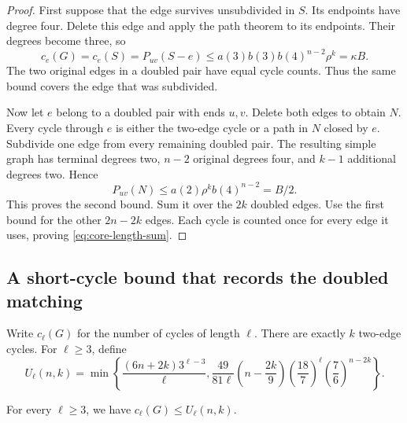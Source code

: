 \begin{proof}
First suppose that the edge survives unsubdivided in $S$.
Its endpoints have degree four.
Delete this edge and apply the path theorem to its endpoints.
Their degrees become three, so
\[
 c_e(G)=c_e(S)=P_{uv}(S-e)
 \le a(3)b(3)b(4)^{n-2}\rho^k=\kappa B.
\]
The two original edges in a doubled pair have equal cycle counts.
Thus the same bound covers the edge that was subdivided.

Now let $e$ belong to a doubled pair with ends $u,v$.
Delete both edges to obtain $N$.
Every cycle through $e$ is either the two-edge cycle or a path in $N$ closed by $e$.
Subdivide one edge from every remaining doubled pair.
The resulting simple graph has terminal degrees two, $n-2$ original degrees four, and $k-1$ additional degrees two.
Hence
\[
 P_{uv}(N)\le a(2)\rho^k b(4)^{n-2}=B/2.
\]
This proves the second bound.
Sum it over the $2k$ doubled edges.
Use the first bound for the other $2n-2k$ edges.
Each cycle is counted once for every edge it uses, proving \eqref{eq:core-length-sum}.
\end{proof}

\subsection{A short-cycle bound that records the doubled matching}

Write $c_\ell(G)$ for the number of cycles of length $\ell$.
There are exactly $k$ two-edge cycles.
For $\ell\ge3$, define
\begin{equation}\label{eq:core-U}
 U_\ell(n,k)=\min\left\{
  \frac{(6n+2k)3^{\ell-3}}\ell,
  \frac{49}{81\ell}\left(n-\frac{2k}{9}\right)
       \left(\frac{18}{7}\right)^\ell
       \left(\frac76\right)^{n-2k}
 \right\}.
\end{equation}

\begin{lemma}\label{lem:core-short-cycles}
For every $\ell\ge3$, we have $c_\ell(G)\le U_\ell(n,k)$.
\end{lemma}

